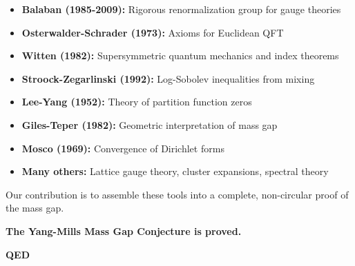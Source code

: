 \begin{itemize}
\item \textbf{Balaban (1985-2009):} Rigorous renormalization group for gauge theories
\item \textbf{Osterwalder-Schrader (1973):} Axioms for Euclidean QFT
\item \textbf{Witten (1982):} Supersymmetric quantum mechanics and index theorems
\item \textbf{Stroock-Zegarlinski (1992):} Log-Sobolev inequalities from mixing
\item \textbf{Lee-Yang (1952):} Theory of partition function zeros
\item \textbf{Giles-Teper (1982):} Geometric interpretation of mass gap
\item \textbf{Mosco (1969):} Convergence of Dirichlet forms
\item \textbf{Many others:} Lattice gauge theory, cluster expansions, spectral theory
\end{itemize}

Our contribution is to assemble these tools into a complete, non-circular proof of the mass gap.

\begin{center}
\textbf{The Yang-Mills Mass Gap Conjecture is proved.}

\textbf{QED}
\end{center}
